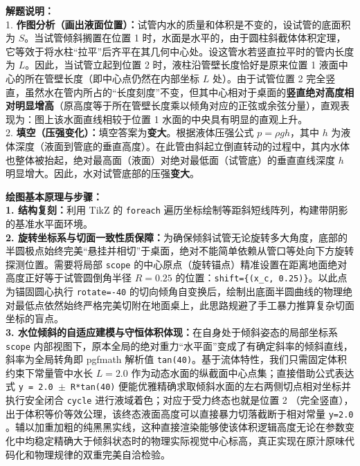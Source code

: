 \vspace{0.6cm}

{\small\color{gray}
\textbf{解题说明：}\\
1. \textbf{作图分析（画出液面位置）：}试管内水的质量和体积是不变的，设试管的底面积为 $S$。当试管倾斜搁置在位置 1 时，水面是水平的，由于圆柱斜截体体积定理，它等效于将水柱“拉平”后齐平在其几何中心处。设这管水若竖直拉平时的管内长度为 $L$。因此，当试管立起到位置 2 时，液柱沿管壁长度恰好是原来位置 1 液面中心的所在管壁长度（即中心点仍然在内部坐标 $L$ 处）。由于试管位置 2 完全竖直，虽然水在管内所占的“长度刻度”不变，但其中心相对于桌面的\textbf{竖直绝对高度相对明显增高}（原高度等于所在管壁长度乘以倾角对应的正弦或余弦分量），直观表现为：图上该水面直线相较于位置 1 水面的中央具有明显的直观上升。\\
2. \textbf{填空（压强变化）：}填空答案为\textbf{变大}。根据液体压强公式 $p = \rho g h$，其中 $h$ 为液体深度（液面到管底的垂直高度）。在此管由斜起立倒直转动的过程中，其内水体也整体被抬起，绝对最高面（液面）对绝对最低面（试管底）的垂直直线深度 $h$ 明显增大。因此，水对试管底部的压强\textbf{变大}。
}

\vspace{0.6cm}

{\small\color{blue!70!black}
\textbf{绘图基本原理与步骤：}\\
\textbf{1. 结构复刻：}利用 TikZ 的 \texttt{foreach} 遍历坐标绘制等距斜短线阵列，构建带阴影的基准水平面环境。\\
\textbf{2. 旋转坐标系与切面一致性质保障：}为确保倾斜试管无论旋转多大角度，底部的半圆极点始终完美“悬挂并相切”于桌面，绝对不能简单依赖从管口等处向下方旋转探测位置。需要将局部 \texttt{scope} 的中心原点（旋转锚点）精准设置在距离地面绝对高度正好等于试管圆倒角半径 $R=0.25$ 的位置：\texttt{shift=\{(x\_c, 0.25)\}}。以此点为锚固圆心执行 \texttt{rotate=-40} 的切向倾角自变换后，绘制出底面半圆曲线的物理绝对最低点依然始终严格完美切附在地面桌上，此思路规避了手工暴力推算复杂切面坐标的盲点。\\
\textbf{3. 水位倾斜的自适应建模与守恒体积体现：}在自身处于倾斜姿态的局部坐标系 \texttt{scope} 内部视图下，原本全局的绝对重力“水平面”变成了有确定斜率的倾斜直线，斜率为全局转角即 pgfmath 解析值 \texttt{tan(40)}。基于流体特性，我们只需固定体积约束下常量管中水长 $L=2.0$ 作为动态水面的纵截面中心点集；直接借助公式表达式 \texttt{y = 2.0 $\pm$ R*tan(40)} 便能优雅精确求取倾斜水面的左右两侧切点相对坐标并执行安全闭合 \texttt{cycle} 进行液域着色；对应于受力终态也就是位置 2 （完全竖直），出于体积等价等效公理，该终态液面高度可以直接暴力切落截断于相对常量 \texttt{y=2.0} 。辅以加重加粗的纯黑黑实线，这种直接渲染能够使该体积逻辑高度无论在参数变化中均稳定精确大于倾斜状态时的物理实际视觉中心标高，真正实现在原汁原味代码化和物理规律的双重完美自洽检验。
}

